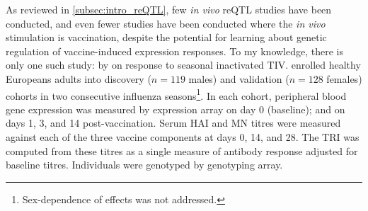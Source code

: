 As reviewed in \cref{subsec:intro_reQTL},
few \textit{in vivo} \gls{reQTL} studies have been conducted,
and even fewer studies have been conducted where the \textit{in vivo} stimulation is vaccination,
despite the potential for learning about genetic regulation of vaccine-induced expression responses.
To my knowledge, there is only one such study: by \textcite{franco2013IntegrativeGenomicAnalysis} on response to seasonal inactivated \gls{TIV}.
\textcite{franco2013IntegrativeGenomicAnalysis} enrolled healthy Europeans adults into discovery ($n=119$ males) and validation ($n=128$ females) cohorts in two consecutive influenza seasons\footnote{Sex-dependence of effects was not addressed.}.
In each cohort, peripheral blood gene expression was measured by expression array on day 0 (baseline); and on days 1, 3, and 14 post-vaccination.
Serum \gls{HAI} and \gls{MN} titres were measured against each of the three vaccine components at days 0, 14, and 28.
The \gls{TRI} \autocite{bucasas2011EarlyPatternsGene} was computed from these titres as a single measure of antibody response adjusted for baseline titres.
Individuals were genotyped by genotyping array.

